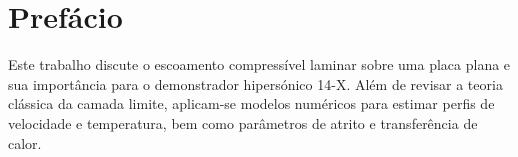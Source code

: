 \documentclass[12pt]{article}
\begin{document}
	\section*{Pref\'acio}
	
	Este trabalho discute o escoamento compress\'ivel laminar sobre uma placa plana e sua import\^ancia para o demonstrador hipers\'onico 14-X. Al\'em de revisar a teoria cl\'assica da camada limite, aplicam-se modelos num\'ericos para estimar perfis de velocidade e temperatura, bem como par\^ametros de atrito e transfer\^encia de calor.
\end{document}
